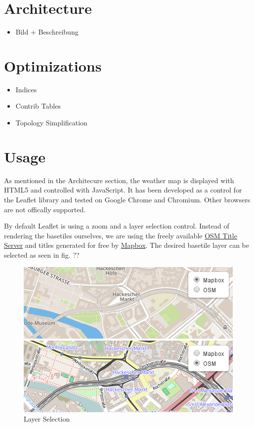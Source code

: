 \section{Architecture}\label{architecture}

\begin{itemize}
\itemsep1pt\parskip0pt
\item
  Bild + Beschreibung
\end{itemize}

\section{Optimizations}\label{optimizations}

\begin{itemize}
\itemsep1pt\parskip0pt
\item
  Indices
\item
  Contrib Tables
\item
  Topology Simplification
\end{itemize}

\section{Usage}\label{usage}

As mentioned in the Architecure section, the weather map is displayed
with HTML5 and controlled with JavaScript. It has been developed as a
control for the Leaflet library and tested on Google Chrome and
Chromium. Other browsers are not offically supported.

By default Leaflet is using a zoom and a layer selection control.
Instead of rendering the basetiles ourselves, we are using the freely
available
\href{http://wiki.openstreetmap.org/wiki/Tile_usage_policy}{OSM Title
Server} and titles generated for free by
\href{https://www.mapbox.com/}{Mapbox}. The desired basetile layer can
be selected as seen in fig. ??

\begin{figure}[htbp]
\centering
\includegraphics{pictures/screenshot-baselayer.png}
\caption{Layer Selection}
\end{figure}

